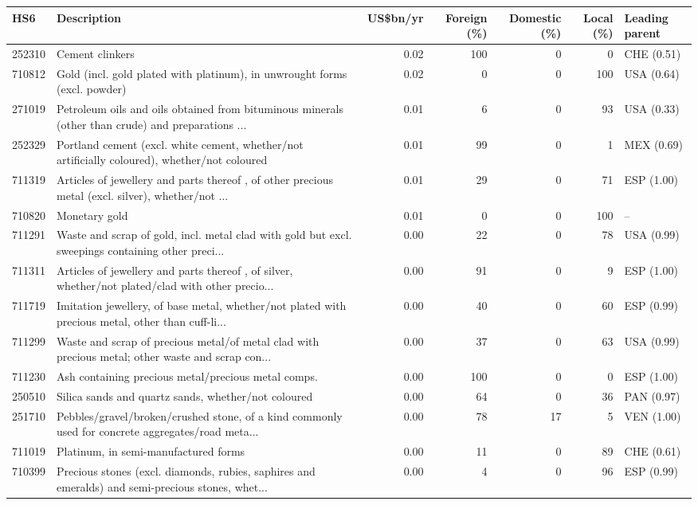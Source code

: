 \begin{tabular}{@{}l p{6.4cm} r r r r l@{}}
\toprule
HS6 & Description & US\$bn/yr & Foreign (\%) & Domestic (\%) & Local (\%) & Leading parent \\
\midrule
252310 & Cement clinkers & 0.02 & 100 & 0 & 0 & CHE (0.51) \\
710812 & Gold (incl. gold plated with platinum), in unwrought forms (excl. powder) & 0.02 & 0 & 0 & 100 & USA (0.64) \\
271019 & Petroleum oils and oils obtained from bituminous minerals (other than crude) and preparations ... & 0.01 & 6 & 0 & 93 & USA (0.33) \\
252329 & Portland cement (excl. white cement, whether/\allowbreak{}not artificially coloured), whether/\allowbreak{}not coloured & 0.01 & 99 & 0 & 1 & MEX (0.69) \\
711319 & Articles of jewellery and parts thereof , of other precious metal (excl. silver), whether/\allowbreak{}not ... & 0.01 & 29 & 0 & 71 & ESP (1.00) \\
710820 & Monetary gold & 0.01 & 0 & 0 & 100 & -- \\
711291 & Waste and scrap of gold, incl. metal clad with gold but excl. sweepings containing other preci... & 0.00 & 22 & 0 & 78 & USA (0.99) \\
711311 & Articles of jewellery and parts thereof , of silver, whether/\allowbreak{}not plated/\allowbreak{}clad with other precio... & 0.00 & 91 & 0 & 9 & ESP (1.00) \\
711719 & Imitation jewellery, of base metal, whether/\allowbreak{}not plated with precious metal, other than cuff-li... & 0.00 & 40 & 0 & 60 & ESP (0.99) \\
711299 & Waste and scrap of precious metal/\allowbreak{}of metal clad with precious metal; other waste and scrap con... & 0.00 & 37 & 0 & 63 & USA (0.99) \\
711230 & Ash containing precious metal/\allowbreak{}precious metal comps. & 0.00 & 100 & 0 & 0 & ESP (1.00) \\
250510 & Silica sands and quartz sands, whether/\allowbreak{}not coloured & 0.00 & 64 & 0 & 36 & PAN (0.97) \\
251710 & Pebbles/\allowbreak{}gravel/\allowbreak{}broken/\allowbreak{}crushed stone, of a kind commonly used for concrete aggregates/\allowbreak{}road meta... & 0.00 & 78 & 17 & 5 & VEN (1.00) \\
711019 & Platinum, in semi-manufactured forms & 0.00 & 11 & 0 & 89 & CHE (0.61) \\
710399 & Precious stones (excl. diamonds, rubies, saphires and emeralds) and semi-precious stones, whet... & 0.00 & 4 & 0 & 96 & ESP (0.99) \\
\bottomrule
\end{tabular}
